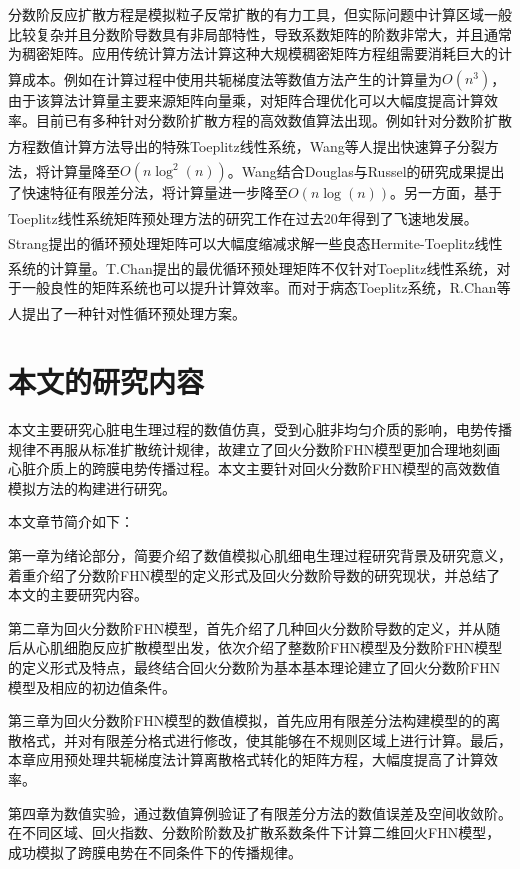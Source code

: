 \documentclass[twoside,UTF8]{nputhesis}
\newcommand{\upcite}[1]{\textsuperscript{\textsuperscript{\cite{#1}}}}
\begin{document}
分数阶反应扩散方程是模拟粒子反常扩散的有力工具，但实际问题中计算区域一般比较复杂并且分数阶导数具有非局部特性，导致系数矩阵的阶数非常大，并且通常为稠密矩阵。应用传统计算方法计算这种大规模稠密矩阵方程组需要消耗巨大的计算成本。例如在计算过程中使用共轭梯度法等数值方法产生的计算量为$O({{n}^{3}})$\upcite{golub1996cf}，由于该算法计算量主要来源矩阵向量乘，对矩阵合理优化可以大幅度提高计算效率。目前已有多种针对分数阶扩散方程的高效数值算法出现。例如针对分数阶扩散方程数值计算方法导出的特殊Toeplitz线性系统，Wang等人\upcite{wang2010direct}提出快速算子分裂方法，将计算量降至$O(n{{\log }^{2}}(n))$。Wang\upcite{wang2011fast}结合Douglas与Russel的研究成果\upcite{douglas1982numerical}提出了快速特征有限差分法，将计算量进一步降至$O(n\log (n))$。另一方面，基于Toeplitz线性系统矩阵预处理方法的研究工作在过去20年得到了飞速地发展\upcite{chan2007introduction, jin2003developments, ng2004iterative}。Strang\upcite{strang1986proposal}提出的循环预处理矩阵可以大幅度缩减求解一些良态Hermite-Toeplitz线性系统的计算量。T.Chan\upcite{chan1988optimal}提出的最优循环预处理矩阵不仅针对Toeplitz线性系统，对于一般良性的矩阵系统也可以提升计算效率。而对于病态Toeplitz系统，R.Chan等人\upcite{chan1995best}提出了一种针对性循环预处理方案。


\section{本文的研究内容}
本文主要研究心脏电生理过程的数值仿真，受到心脏非均匀介质的影响，电势传播规律不再服从标准扩散统计规律，故建立了回火分数阶FHN模型更加合理地刻画心脏介质上的跨膜电势传播过程。本文主要针对回火分数阶FHN模型的高效数值模拟方法的构建进行研究。

本文章节简介如下：

第一章为绪论部分，简要介绍了数值模拟心肌细电生理过程研究背景及研究意义，着重介绍了分数阶FHN模型的定义形式及回火分数阶导数的研究现状，并总结了本文的主要研究内容。

第二章为回火分数阶FHN模型，首先介绍了几种回火分数阶导数的定义，并从随后从心肌细胞反应扩散模型出发，依次介绍了整数阶FHN模型及分数阶FHN模型的定义形式及特点，最终结合回火分数阶为基本基本理论建立了回火分数阶FHN模型及相应的初边值条件。

第三章为回火分数阶FHN模型的数值模拟，首先应用有限差分法构建模型的的离散格式，并对有限差分格式进行修改，使其能够在不规则区域上进行计算。最后，本章应用预处理共轭梯度法计算离散格式转化的矩阵方程，大幅度提高了计算效率。

第四章为数值实验，通过数值算例验证了有限差分方法的数值误差及空间收敛阶。在不同区域、回火指数、分数阶阶数及扩散系数条件下计算二维回火FHN模型，成功模拟了跨膜电势在不同条件下的传播规律。
\end{document}
